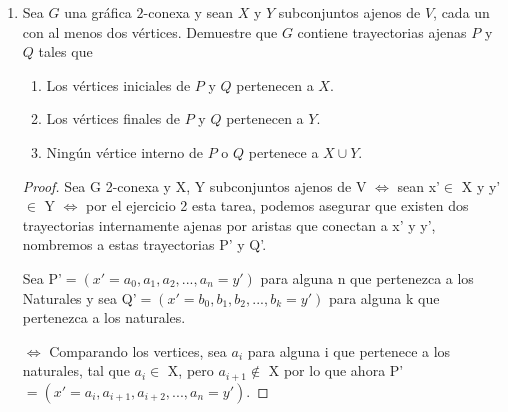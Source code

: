 \documentclass{article}
\begin{document}
\begin{enumerate}
  \renewcommand\qedsymbol{QED}
  \begin{proof}
    Procedemos por contrapositiva.

    Demostraremos que si ningún bloque de $G$ es $K_{1}$, $K_{2}$ ni un ciclo impar, entonces $G$ tiene ciclos pares.

    Sea $G$ una gráfica y $G_{1}$ un bloque de $G$ con al menos $3$ vértices.

    El inciso $c)$ del \textbf{Ejercicio $5$} nos dice que:
    $$\text{Para cualesquiera dos vértices de } G \text{, existe un ciclo que los contiene}$$

    Por lo anterior, entonces $G_{1}$ contiene un ciclo y además, por hipótesis, tenemos que
    $G_{1}$ no tiene ciclos impares.

    Por lo tanto, $G_{1}$ tiene ciclos pares.
  \end{proof}


\item Sea $G$ una gr\'afica $2$-conexa y sean $X$ y $Y$ subconjuntos ajenos de $V$,
  cada un con al menos dos v\'ertices.   Demuestre que $G$ contiene
  trayectorias ajenas $P$ y $Q$ tales que

  \begin{enumerate}
  \item Los v\'ertices iniciales de $P$ y $Q$ pertenecen a $X$.

  \item Los v\'ertices finales de $P$ y $Q$ pertenecen a $Y$.

  \item Ning\'un v\'ertice interno de $P$ o $Q$ pertenece a $X \cup Y$.
  \end{enumerate}

  \renewcommand\qedsymbol{QED}
  \begin{proof}
    Sea G 2-conexa y X, Y subconjuntos ajenos de V $\Leftrightarrow$ sean x'$\in$ X y y'$\in$ Y
    $\Leftrightarrow$ por el ejercicio 2 esta tarea, podemos asegurar que existen dos trayectorias
    internamente ajenas por aristas que conectan a x' y y', nombremos a estas trayectorias P' y Q'.

    Sea P'$=(x'=a_0, a_1, a_2, ..., a_n = y')$ para alguna n que pertenezca a los Naturales y sea
    Q'$=(x' =b_0, b_1, b_2, ..., b_k = y')$ para alguna k que pertenezca a los naturales.

    $\Leftrightarrow$ Comparando los vertices, sea $a_i$ para alguna i que pertenece a los naturales,
    tal que  $a_i \in$ X, pero  $a_{i+1} \notin$ X por lo que ahora P'$=(x'=a_i, a_{i+1}, a_{i+2}, ..., a_n = y')$.


\end{proof}
\end{enumerate}
\end{document}
